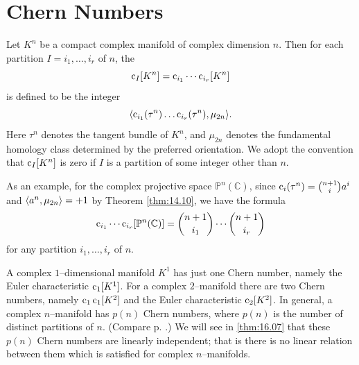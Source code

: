 \documentclass[../main]{subfiles}
\begin{document}
\section{Chern Numbers}
Let $K^n$ be a compact complex manifold of complex dimension $n$. Then for each partition $I = i_1, \ldots, i_r$ of $n$, the  \[\operatorname{c}_I[K^n] = \operatorname{c}_{i_1} \cdots \operatorname{c}_{i_r}[K^n]\] is defined to be the integer \[\langle\operatorname{c}_{i_1} (\tau^n) \ldots \operatorname{c}_{i_r}(\tau^n),\mu_{2n}\rangle.\] Here $\tau^n$ denotes the tangent bundle of $K^n$, and $\mu_{2n}$ denotes the fundamental homology class determined by the preferred orientation. We adopt the convention that $\operatorname{c}_I[K^n]$ is zero if $I$ is a partition of some integer other than $n$. 

As an example, for the complex projective space ${\mathbb P}^n(\mathbb C)$, since $\operatorname{c}_i(\tau^n) = \binom {n + 1} i a^i$ and $\langle a^n,\mu_{2n}\rangle = +1$ by Theorem \ref{thm:14.10}, we have the formula \[\operatorname{c}_{i_1} \cdots \operatorname{c}_{i_r} [{\mathbb P}^n(\mathbb C)] = \binom {n + 1} {i_1} \cdots \binom {n + 1} {i_r}\] for any partition $i_1, \ldots, i_r$ of $n$. 

A complex $1$--dimensional manifold $K^1$ has just one Chern number, namely the Euler characteristic $\operatorname{c}_1[K^1]$. For a complex $2$--manifold there are two Chern numbers, namely $\operatorname{c}_1 \operatorname{c}_1[K^2]$ and the Euler characteristic $\operatorname{c}_2[K^2]$. In general, a complex $n$--manifold has $p(n)$ Chern numbers, where $p(n)$ is the number of distinct partitions of $n$. (Compare p. \pageref{def:06.06}.) We will see in \ref{thm:16.07} that these $p(n)$ Chern numbers are linearly independent; that is there is no linear relation between them which is satisfied for  complex $n$--manifolds. 
\end{document}

